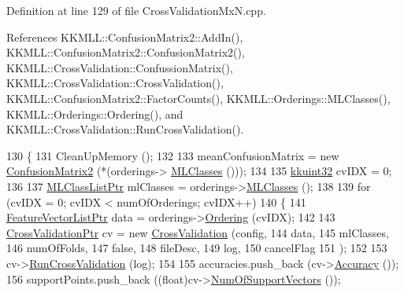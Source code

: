 Definition at line 129 of file Cross\+Validation\+Mx\+N.\+cpp.



References K\+K\+M\+L\+L\+::\+Confusion\+Matrix2\+::\+Add\+In(), K\+K\+M\+L\+L\+::\+Confusion\+Matrix2\+::\+Confusion\+Matrix2(), K\+K\+M\+L\+L\+::\+Cross\+Validation\+::\+Confussion\+Matrix(), K\+K\+M\+L\+L\+::\+Cross\+Validation\+::\+Cross\+Validation(), K\+K\+M\+L\+L\+::\+Confusion\+Matrix2\+::\+Factor\+Counts(), K\+K\+M\+L\+L\+::\+Orderings\+::\+M\+L\+Classes(), K\+K\+M\+L\+L\+::\+Orderings\+::\+Ordering(), and K\+K\+M\+L\+L\+::\+Cross\+Validation\+::\+Run\+Cross\+Validation().


\begin{DoxyCode}
130 \{ 
131   CleanUpMemory ();
132 
133   meanConfusionMatrix = \textcolor{keyword}{new} \hyperlink{class_k_k_m_l_l_1_1_confusion_matrix2}{ConfusionMatrix2} (*(orderings->
      \hyperlink{class_k_k_m_l_l_1_1_orderings_ae62368abdc7b7e28bbe7a9a175e659c4}{MLClasses} ()));
134 
135   \hyperlink{namespace_k_k_b_af8d832f05c54994a1cce25bd5743e19a}{kkuint32}  cvIDX = 0;
136 
137   \hyperlink{class_k_k_m_l_l_1_1_m_l_class_list}{MLClassListPtr}  mlClasses = orderings->\hyperlink{class_k_k_m_l_l_1_1_orderings_ae62368abdc7b7e28bbe7a9a175e659c4}{MLClasses} ();
138 
139   \textcolor{keywordflow}{for}  (cvIDX = 0;  cvIDX < numOfOrderings;  cvIDX++)
140   \{
141     \hyperlink{class_k_k_m_l_l_1_1_feature_vector_list}{FeatureVectorListPtr}  data = orderings->\hyperlink{class_k_k_m_l_l_1_1_orderings_a5c02baa64a2c46b638b1e2e7f93d23ff}{Ordering} (cvIDX);
142 
143     \hyperlink{class_k_k_m_l_l_1_1_cross_validation}{CrossValidationPtr}  cv = \textcolor{keyword}{new} \hyperlink{class_k_k_m_l_l_1_1_cross_validation}{CrossValidation} (config,
144                                                   data,
145                                                   mlClasses,
146                                                   numOfFolds,
147                                                   \textcolor{keyword}{false},
148                                                   fileDesc,
149                                                   log,
150                                                   cancelFlag
151                                                  );
152 
153     cv->\hyperlink{class_k_k_m_l_l_1_1_cross_validation_a8b00470a7c930864edafe62255c85111}{RunCrossValidation} (log);
154 
155     accuracies.push\_back    (cv->\hyperlink{class_k_k_m_l_l_1_1_cross_validation_af43d0127d482cc937f26f3c908f1dce4}{Accuracy}       ());
156     supportPoints.push\_back ((\textcolor{keywordtype}{float})cv->\hyperlink{class_k_k_m_l_l_1_1_cross_validation_a06b70dd82b9d39d62f2497717863b642}{NumOfSupportVectors} ());

\end{DoxyCode}
